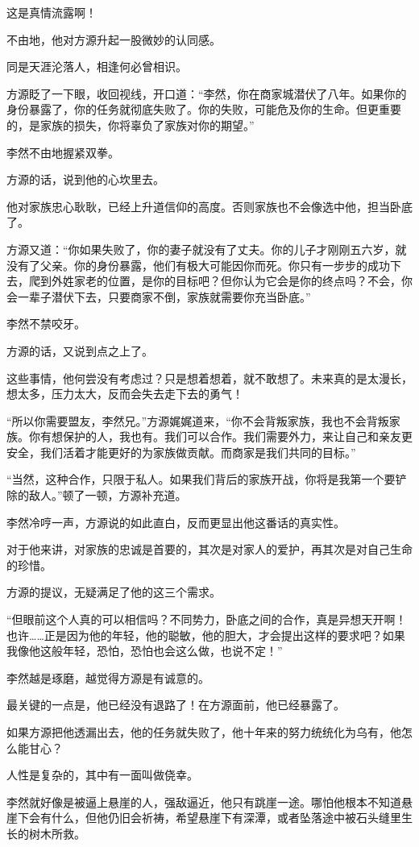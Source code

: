 \begin{this_body}
这是真情流露啊！

不由地，他对方源升起一股微妙的认同感。

同是天涯沦落人，相逢何必曾相识。

方源眨了一下眼，收回视线，开口道：“李然，你在商家城潜伏了八年。如果你的身份暴露了，你的任务就彻底失败了。你的失败，可能危及你的生命。但更重要的，是家族的损失，你将辜负了家族对你的期望。”

李然不由地握紧双拳。

方源的话，说到他的心坎里去。

他对家族忠心耿耿，已经上升道信仰的高度。否则家族也不会像选中他，担当卧底了。

方源又道：“你如果失败了，你的妻子就没有了丈夫。你的儿子才刚刚五六岁，就没有了父亲。你的身份暴露，他们有极大可能因你而死。你只有一步步的成功下去，爬到外姓家老的位置，是你的目标吧？但你认为它会是你的终点吗？不会，你会一辈子潜伏下去，只要商家不倒，家族就需要你充当卧底。”

李然不禁咬牙。

方源的话，又说到点之上了。

这些事情，他何尝没有考虑过？只是想着想着，就不敢想了。未来真的是太漫长，想太多，压力太大，反而会失去走下去的勇气！

“所以你需要盟友，李然兄。”方源娓娓道来，“你不会背叛家族，我也不会背叛家族。你有想保护的人，我也有。我们可以合作。我们需要外力，来让自己和亲友更安全，我们活着才能更好的为家族做贡献。而商家是我们共同的目标。”

“当然，这种合作，只限于私人。如果我们背后的家族开战，你将是我第一个要铲除的敌人。”顿了一顿，方源补充道。

李然冷哼一声，方源说的如此直白，反而更显出他这番话的真实性。

对于他来讲，对家族的忠诚是首要的，其次是对家人的爱护，再其次是对自己生命的珍惜。

方源的提议，无疑满足了他的这三个需求。

“但眼前这个人真的可以相信吗？不同势力，卧底之间的合作，真是异想天开啊！也许……正是因为他的年轻，他的聪敏，他的胆大，才会提出这样的要求吧？如果我像他这般年轻，恐怕，恐怕也会这么做，也说不定！”

李然越是琢磨，越觉得方源是有诚意的。

最关键的一点是，他已经没有退路了！在方源面前，他已经暴露了。

如果方源把他透漏出去，他的任务就失败了，他十年来的努力统统化为乌有，他怎么能甘心？

人性是复杂的，其中有一面叫做侥幸。

李然就好像是被逼上悬崖的人，强敌逼近，他只有跳崖一途。哪怕他根本不知道悬崖下会有什么，但他仍旧会祈祷，希望悬崖下有深潭，或者坠落途中被石头缝里生长的树木所救。


\end{this_body}
